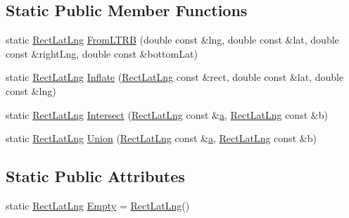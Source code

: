 \subsection*{\-Static \-Public \-Member \-Functions}
\begin{DoxyCompactItemize}
\item 
static \hyperlink{structinternals_1_1_rect_lat_lng}{\-Rect\-Lat\-Lng} \hyperlink{group___o_p_map_widget_gaaf71d43bd87065c51a98a46717d581a6}{\-From\-L\-T\-R\-B} (double const \&lng, double const \&lat, double const \&right\-Lng, double const \&bottom\-Lat)
\item 
static \hyperlink{structinternals_1_1_rect_lat_lng}{\-Rect\-Lat\-Lng} \hyperlink{group___o_p_map_widget_ga41e7a0b707e7e348e2d4f9b8aa3f2831}{\-Inflate} (\hyperlink{structinternals_1_1_rect_lat_lng}{\-Rect\-Lat\-Lng} const \&rect, double const \&lat, double const \&lng)
\item 
static \hyperlink{structinternals_1_1_rect_lat_lng}{\-Rect\-Lat\-Lng} \hyperlink{group___o_p_map_widget_ga6590bcf87d4c6a72e570bcfcca89a5bf}{\-Intersect} (\hyperlink{structinternals_1_1_rect_lat_lng}{\-Rect\-Lat\-Lng} const \&\hyperlink{_o_p_plots_8m_ab6991d210d93a78cdbdf6de1889c1259}{a}, \hyperlink{structinternals_1_1_rect_lat_lng}{\-Rect\-Lat\-Lng} const \&b)
\item 
static \hyperlink{structinternals_1_1_rect_lat_lng}{\-Rect\-Lat\-Lng} \hyperlink{group___o_p_map_widget_ga2b63b270f234d9f18a58415ff69b37e7}{\-Union} (\hyperlink{structinternals_1_1_rect_lat_lng}{\-Rect\-Lat\-Lng} const \&\hyperlink{_o_p_plots_8m_ab6991d210d93a78cdbdf6de1889c1259}{a}, \hyperlink{structinternals_1_1_rect_lat_lng}{\-Rect\-Lat\-Lng} const \&b)
\end{DoxyCompactItemize}
\subsection*{\-Static \-Public \-Attributes}
\begin{DoxyCompactItemize}
\item 
static \hyperlink{structinternals_1_1_rect_lat_lng}{\-Rect\-Lat\-Lng} \hyperlink{group___o_p_map_widget_ga0975dcf29ee445b5510f2c502940b50a}{\-Empty} = \hyperlink{structinternals_1_1_rect_lat_lng}{\-Rect\-Lat\-Lng}()
\end{DoxyCompactItemize}
